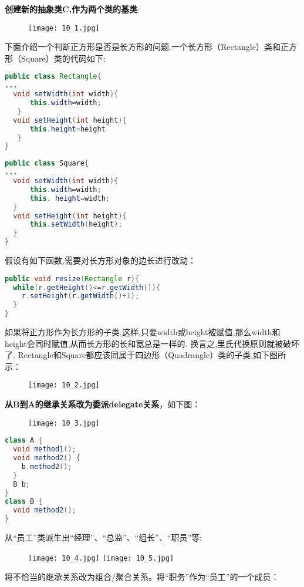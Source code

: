 \documentclass[../main.tex]{subfiles}
\begin{document}
\textbf{创建新的抽象类C,作为两个类的基类}:
\begin{figure}[H]
  \texttt{[image: 10\_1.jpg]}
\end{figure}
下面介绍一个判断正方形是否是长方形的问题.一个长方形（Rectangle）类和正方形（Square）类的代码如下:
\begin{lstlisting}[language=java]
public class Rectangle{
...
  void setWidth(int width){
      this.width=width;
   }
  void setHeight(int height){
      this.height=height
   }
}
\end{lstlisting}
\begin{lstlisting}[language=java]
public class Square{
...
  void setWidth(int width){
      this.width=width;
      this. height=width;
  }
  void setHeight(int height){
      this.setWidth(height);
  }
}
\end{lstlisting}
假设有如下函数,需要对长方形对象的边长进行改动：
\begin{lstlisting}[language=java]
public void resize(Rectangle r){
  while(r.getHeight()<=r.getWidth()){
    r.setHeight(r.getWidth()+1);
  }
}
\end{lstlisting}
如果将正方形作为长方形的子类,这样,只要width或height被赋值,那么width和height会同时赋值,从而长方形的长和宽总是一样的.
换言之,里氏代换原则就被破坏了.
Rectangle和Square都应该同属于四边形（Quadrangle）类的子类,如下图所示：
\begin{figure}[H]
  \texttt{[image: 10\_2.jpg]}
\end{figure}
\textbf{从B到A的继承关系改为委派delegate关系}，如下图：
\begin{figure}[H]
  \texttt{[image: 10\_3.jpg]}
\end{figure}
\begin{lstlisting}[language=java]
class A {
  void method1();
  void method2() {
    b.method2();
  }
  B b;
}
class B {
  void method2();
}
\end{lstlisting}
从``员工''类派生出``经理''、``总监''、``组长''、``职员''等:
\begin{figure}[H]
  \texttt{[image: 10\_4.jpg]}
  \texttt{[image: 10\_5.jpg]}
\end{figure}
将不恰当的继承关系改为组合/聚合关系。将``职务''作为``员工''的一个成员：
\end{document}
